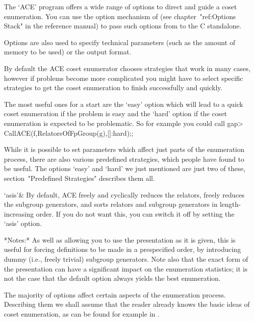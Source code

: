 The `ACE' program offers a wide range of options to direct and guide a
coset enumeration. You can use the option mechanism of {\GAP} (see
chapter~"ref:Options Stack" in the reference manual) to pass such options
from {\GAP} to the C standalone. 

Options are also used to specify technical parameters (such as the amount of
memory to be used) or the output format.

By default the ACE coset enumerator chooses strategies that work in many 
cases, however if problems become more complicated you might have to select
specific strategies to get the coset enumeration to finish successfully and
quickly.

The most useful ones for a start are the `easy' option which will lead to a
quick coset enumeration if the problem is easy and the `hard' option if the
coset enumeration is expected to be problematic.
So for example you could call
\begintt
gap> CallACE(f,RelatorsOfFpGroup(g),[]:hard);;
\endtt

While it is possible to set parameters which affect just parts of the
enumeration process, there are also various predefined strategies, which
people have found to be useful. The options `easy' and `hard' we just
mentioned are just two of these, section~"Predefined Strategies" describes
them all.


\beginitems
`asis'&
By default, ACE freely and cyclically reduces the relators, freely
  reduces the subgroup generators, and sorts relators and subgroup generators
  in length-increasing order.
If you do not want this, you can switch it off by setting the `asis' option.

*Notes:*
As well as allowing you to use the presentation as it is given, this is
useful for forcing definitions to be made in a prespecified order, by
introducing dummy (i.e., freely trivial) subgroup generators.  Note also
that the exact form of the presentation can have a significant impact on the
enumeration statistics; it is not the case that the default option always
yields the best enumeration.
\enditems


The majority of options affect certain aspects of the enumeration process.
Describing them we shall assume that the reader already knows the basic
ideas of coset enumeration, as can be found for example in
\cite{Neu84}.

